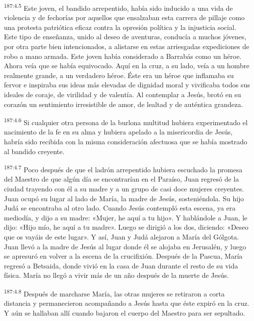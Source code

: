 \par 
\textsuperscript{187:4.5} Este joven, el bandido arrepentido, había sido inducido a una vida de violencia y de fechorías por aquellos que ensalzaban esta carrera de pillaje como una protesta patriótica eficaz contra la opresión política y la injusticia social. Este tipo de enseñanza, unido al deseo de aventuras, conducía a muchos jóvenes, por otra parte bien intencionados, a alistarse en estas arriesgadas expediciones de robo a mano armada. Este joven había considerado a Barrabás como un héroe. Ahora veía que se había equivocado. Aquí en la cruz, a su lado, veía a un hombre realmente grande, a un verdadero héroe. Éste era un héroe que inflamaba su fervor e inspiraba sus ideas más elevadas de dignidad moral y vivificaba todos sus ideales de coraje, de virilidad y de valentía. Al contemplar a Jesús, brotó en su corazón un sentimiento irresistible de amor, de lealtad y de auténtica grandeza.

\par 
\textsuperscript{187:4.6} Si cualquier otra persona de la burlona multitud hubiera experimentado el nacimiento de la fe en su alma y hubiera apelado a la misericordia de Jesús, habría sido recibida con la misma consideración afectuosa que se había mostrado al bandido creyente.

\par 
\textsuperscript{187:4.7} Poco después de que el ladrón arrepentido hubiera escuchado la promesa del Maestro de que algún día se encontrarían en el Paraíso, Juan regresó de la ciudad trayendo con él a su madre y a un grupo de casi doce mujeres creyentes. Juan ocupó su lugar al lado de María, la madre de Jesús, sosteniéndola. Su hijo Judá se encontraba al otro lado. Cuando Jesús contempló esta escena, ya era mediodía, y dijo a su madre: «Mujer, he aquí a tu hijo». Y hablándole a Juan, le dijo: «Hijo mío, he aquí a tu madre». Luego se dirigió a los dos, diciendo: «Deseo que os vayáis de este lugar». Y así, Juan y Judá alejaron a María del Gólgota. Juan llevó a la madre de Jesús al lugar donde él se alojaba en Jerusalén, y luego se apresuró en volver a la escena de la crucifixión. Después de la Pascua, María regresó a Betsaida, donde vivió en la casa de Juan durante el resto de su vida física. María no llegó a vivir más de un año después de la muerte de Jesús.

\par 
\textsuperscript{187:4.8} Después de marcharse María, las otras mujeres se retiraron a corta distancia y permanecieron acompañando a Jesús hasta que éste expiró en la cruz. Y aún se hallaban allí cuando bajaron el cuerpo del Maestro para ser sepultado.

